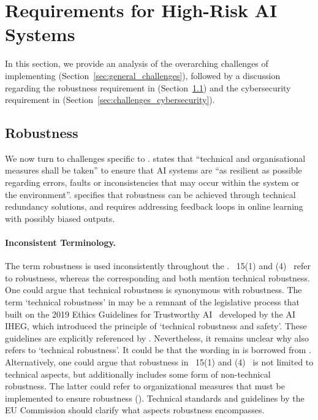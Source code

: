 
\section{Requirements for High-Risk AI Systems}\label{sec:legal_challenges}
%
In this section, we provide an analysis of the overarching challenges of implementing  (Section~\ref{sec:general_challenges}), followed by a discussion regarding the robustness requirement in  (Section~\ref{sec:challenges_robustness}) and the cybersecurity requirement in  (Section~\ref{sec:challenges_cybersecurity}). 





 \subsection{Robustness }\label{sec:challenges_robustness}
%
We now turn to 
challenges specific to .
 states that ``technical and organisational measures shall be taken'' to ensure that AI systems are ``as resilient as possible regarding errors, faults or
inconsistencies that may occur within the system or the environment''.  specifies that robustness can be achieved through technical redundancy
solutions, and  requires addressing feedback loops in online learning with possibly biased outputs.


\paragraph{Inconsistent Terminology.}
The term robustness is used inconsistently throughout the \EUAIAct.
%
\Artx\ 15(1) and (4) \EUAIAct\ refer to robustness, whereas the corresponding  and  both mention technical robustness. 
%
One could argue that technical robustness is synonymous with robustness. 
% 
The term `technical robustness' in  may be a remnant of the legislative process that built on the 2019 Ethics Guidelines for Trustworthy AI~\cite{aiiheg2019guidelines} developed by the AI IHEG, which introduced the principle of `technical robustness and safety'.  
%
These guidelines are explicitly referenced by .
%
Nevertheless, it remains unclear why  also refers to `technical robustness'.
%
It could be that the wording in  is borrowed from .
%
Alternatively, one could argue that robustness in \Artx\ 15(1) and (4) \EUAIAct\ is not limited to technical aspects, but additionally includes some form of non-technical robustness. 
%
The latter could refer to organizational measures that must be implemented to ensure robustness ().
%
Technical standards and guidelines by the EU Commission should clarify what aspects robustness encompasses.
% 


